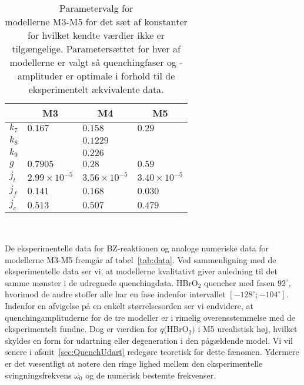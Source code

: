 \begin{table}[t]
 \renewcommand{\capfont}{\bf}
 \capsize
 \begin{minipage}{8cm}
 \begin{center}
  \begin{tabular}{|l|l|l|l|}                  \hline\hline
         & \multicolumn{1}{|c}{M3} 
         & \multicolumn{1}{|c|}{M4} 
         & \multicolumn{1}{c|}{M5}                    \\ \hline
   $k_7$ & $0.167$               & $0.158$   & $0.29$ \\ \hline
   $k_8$ &                       & $0.1229$  &        \\ \hline
   $k_9$ &                       & $0.226$   &        \\ \hline
   $g  $ & $0.7905$              & $0.28$    & $0.59$ \\ \hline
   $j_t$ & $2.99 \times 10^{-5}$ & $3.56 \times 10^{-5}$ & $3.40 \times 10^{-5}$ \\ \hline
   $j_f$ & $0.141$               & $0.168$   & $0.030$\\ \hline
   $j_c$ & $0.513$               & $0.507$   & $0.479$\\ \hline\hline
  \end{tabular}
 \end{center} 
 \end{minipage}
 \ \hfill \
 \begin{minipage}{5cm}
 \caption{\protect\capsize
  Parametervalg for \protect\\model\-lerne M3-M5 for det s{\ae}t 
  af konstanter for hvilket kendte v{\ae}rdier ikke 
  er tilg{\ae}ngelige. Parameters{\ae}ttet for hver af
  model\-lerne er valgt s{\aa} quen\-ching\-fa\-ser
  og -amplituder er optimale i forhold til de
  eksperimentelt {\ae}kvivalente data.
 }
 \end{minipage}
 \label{tab:initdata}
 \normalsize
 \renewcommand{\capfont}{\rm}
\end{table} 
 
\vspace{4.0mm}
De eksperimentelle data for BZ-reaktionen og analoge
numeriske data for model\-lerne M3-M5 fremg{\aa}r af
tabel~\ref{tab:data}. Ved sammenlig\-ning med de
eksperimentelle data ser vi, at model\-lerne kvalitativt
giver anledning til det samme m{\o}nster i de udregnede
quenchingdata. HBrO$_2$ quencher med fasen $92^\circ$,
hvor\-imod de andre stoffer alle har en fase indenfor
intervallet $[-128^\circ;-104^\circ]$. Indenfor en
afvigelse p{\aa} en enkelt st{\o}rrelsesorden ser vi
endvidere, at quen\-ching\-amplituderne for de tre
model\-ler er i rimelig overensstemmelse med de
eksperimentelt fundne. Dog er v{\ae}rdien for $q($HBrO$_2)$
i M5 urealistisk h{\o}j, hvilket skyldes en form for
udartning eller degeneration i den p{\aa}g{\ae}ldende
model. Vi vil senere i afsnit~\ref{sec:QuenchUdart}
redeg{\o}re teoretisk for dette f{\ae}nomen. Ydermere er
det v{\ae}sentligt at notere den ringe lighed mellem den
eksperimentelle sving\-ningsfrekvens $\omega_0$ og de
numerisk bestemte frekvenser.

